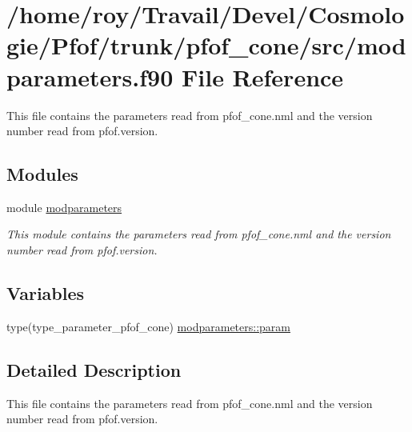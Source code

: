 \hypertarget{modparameters_8f90}{}\section{/home/roy/\+Travail/\+Devel/\+Cosmologie/\+Pfof/trunk/pfof\+\_\+cone/src/modparameters.f90 File Reference}
\label{modparameters_8f90}


This file contains the parameters read from pfof\+\_\+cone.\+nml and the version number read from pfof.\+version.  


\subsection*{Modules}
\begin{DoxyCompactItemize}
\item 
module \hyperlink{namespacemodparameters}{modparameters}
\begin{DoxyCompactList}\small\item\em This module contains the parameters read from pfof\+\_\+cone.\+nml and the version number read from pfof.\+version. \end{DoxyCompactList}\end{DoxyCompactItemize}
\subsection*{Variables}
\begin{DoxyCompactItemize}
\item 
type(type\+\_\+parameter\+\_\+pfof\+\_\+cone) \hyperlink{namespacemodparameters_a32546175bce08b1ac34285f2ccbcab42}{modparameters\+::param}
\end{DoxyCompactItemize}


\subsection{Detailed Description}
This file contains the parameters read from pfof\+\_\+cone.\+nml and the version number read from pfof.\+version. 

